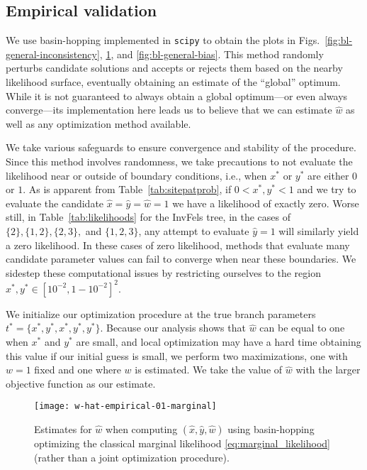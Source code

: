 \subsection*{Empirical validation}

We use basin-hopping \citep{Wales1997} implemented in \texttt{scipy} \citep{Jones2001} to obtain the plots in Figs.~\ref{fig:bl-general-inconsistency}, \ref{fig:bl-general-marginal}, and \ref{fig:bl-general-bias}.
This method randomly perturbs candidate solutions and accepts or rejects them based on the nearby likelihood surface, eventually obtaining an estimate of the ``global'' optimum.
While it is not guaranteed to always obtain a global optimum---or even always converge---its implementation here leads us to believe that we can estimate $\hat{w}$ as well as any optimization method available.

We take various safeguards to ensure convergence and stability of the procedure.
Since this method involves randomness, we take precautions to not evaluate the likelihood near or outside of boundary conditions, i.e., when $x^*$ or $y^*$ are either $0$ or $1$.
As is apparent from Table~\ref{tab:sitepatprob}, if $0 < x^*, y^* < 1$ and we try to evaluate the candidate $\hat{x}=\hat{y}=\hat{w}=1$ we have a likelihood of exactly zero.
Worse still, in Table~\ref{tab:likelihoods} for the InvFels tree, in the cases of $\{2\}, \{1,2\}, \{2,3\},$ and $\{1,2,3\}$, any attempt to evaluate $\hat{y}=1$ will similarly yield a zero likelihood.
In these cases of zero likelihood, methods that evaluate many candidate parameter values can fail to converge when near these boundaries.
We sidestep these computational issues by restricting ourselves to the region $x^*,y^*\in [10^{-2},1-10^{-2}]^2$.

We initialize our optimization procedure at the true branch parameters $t^*=\{x^*,y^*,x^*,y^*,y^*\}$.
Because our analysis shows that $\hat{w}$ can be equal to one when $x^*$ and $y^*$ are small, and local optimization may have a hard time obtaining this value if our initial guess is small, we perform two maximizations, one with $w=1$ fixed and one where $w$ is estimated.
We take the value of $\hat{w}$ with the larger objective function as our estimate.

\begin{figure}
\centering
\texttt{[image: w-hat-empirical-01-marginal]}
\caption{
    Estimates for $\hat{w}$ when computing $(\hat{x}, \hat{y}, \hat{w})$ using basin-hopping \citep{Wales1997} optimizing the classical marginal likelihood \eqref{eq:marginal_likelihood} (rather than a joint optimization procedure).
}
\label{fig:bl-general-marginal}
\end{figure}

